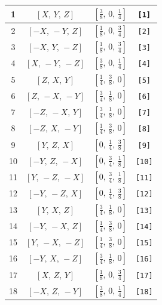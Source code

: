 \documentclass[fleqn,8pt]{jsarticle}
\begin{document}
\begin{longtable}{cccc}
1 & $\left[ X,\, Y,\, Z \right]$ & $\left[ \frac{3}{8},\, 0,\, \frac{1}{4} \right]$ & {\tt [1]} \\ \hline
2 & $\left[ - X,\, - Y,\, Z \right]$ & $\left[ \frac{1}{8},\, 0,\, \frac{3}{4} \right]$ & {\tt [2]} \\ \hline
3 & $\left[ - X,\, Y,\, - Z \right]$ & $\left[ \frac{1}{8},\, 0,\, \frac{3}{4} \right]$ & {\tt [3]} \\ \hline
4 & $\left[ X,\, - Y,\, - Z \right]$ & $\left[ \frac{3}{8},\, 0,\, \frac{1}{4} \right]$ & {\tt [4]} \\ \hline
5 & $\left[ Z,\, X,\, Y \right]$ & $\left[ \frac{1}{4},\, \frac{3}{8},\, 0 \right]$ & {\tt [5]} \\ \hline
6 & $\left[ Z,\, - X,\, - Y \right]$ & $\left[ \frac{3}{4},\, \frac{1}{8},\, 0 \right]$ & {\tt [6]} \\ \hline
7 & $\left[ - Z,\, - X,\, Y \right]$ & $\left[ \frac{3}{4},\, \frac{1}{8},\, 0 \right]$ & {\tt [7]} \\ \hline
8 & $\left[ - Z,\, X,\, - Y \right]$ & $\left[ \frac{1}{4},\, \frac{3}{8},\, 0 \right]$ & {\tt [8]} \\ \hline
9 & $\left[ Y,\, Z,\, X \right]$ & $\left[ 0,\, \frac{1}{4},\, \frac{3}{8} \right]$ & {\tt [9]} \\ \hline
10 & $\left[ - Y,\, Z,\, - X \right]$ & $\left[ 0,\, \frac{3}{4},\, \frac{1}{8} \right]$ & {\tt [10]} \\ \hline
11 & $\left[ Y,\, - Z,\, - X \right]$ & $\left[ 0,\, \frac{3}{4},\, \frac{1}{8} \right]$ & {\tt [11]} \\ \hline
12 & $\left[ - Y,\, - Z,\, X \right]$ & $\left[ 0,\, \frac{1}{4},\, \frac{3}{8} \right]$ & {\tt [12]} \\ \hline
13 & $\left[ Y,\, X,\, Z \right]$ & $\left[ \frac{3}{4},\, \frac{1}{8},\, 0 \right]$ & {\tt [13]} \\ \hline
14 & $\left[ - Y,\, - X,\, Z \right]$ & $\left[ \frac{1}{4},\, \frac{3}{8},\, 0 \right]$ & {\tt [14]} \\ \hline
15 & $\left[ Y,\, - X,\, - Z \right]$ & $\left[ \frac{1}{4},\, \frac{3}{8},\, 0 \right]$ & {\tt [15]} \\ \hline
16 & $\left[ - Y,\, X,\, - Z \right]$ & $\left[ \frac{3}{4},\, \frac{1}{8},\, 0 \right]$ & {\tt [16]} \\ \hline
17 & $\left[ X,\, Z,\, Y \right]$ & $\left[ \frac{1}{8},\, 0,\, \frac{3}{4} \right]$ & {\tt [17]} \\ \hline
18 & $\left[ - X,\, Z,\, - Y \right]$ & $\left[ \frac{3}{8},\, 0,\, \frac{1}{4} \right]$ & {\tt [18]} \\ \hline

\end{longtable}
\end{document}
